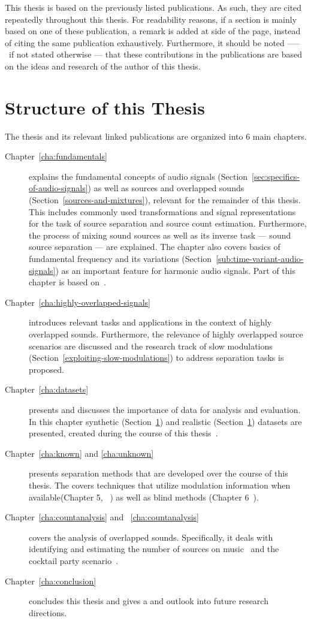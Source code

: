This thesis is based on the previously listed publications. As such, they are cited repeatedly throughout this thesis. For readability reasons, if a section is mainly based on one of these publication, a remark is added at side of the page, instead of citing the same publication exhaustively. Furthermore, it should be noted ––– if not stated otherwise ---  that these contributions in the publications are based on the ideas and research of the author of this thesis.

\section{Structure of this Thesis}

The thesis and its relevant linked publications are organized into 6 main chapters.
\begin{description}
  \item[Chapter~\ref{cha:fundamentals}] explains the fundamental concepts of audio signals (Section~\ref{sec:specifics-of-audio-signals}) as well as sources and overlapped sounds (Section~\ref{sources-and-mixtures}), relevant for the remainder of this thesis.
  This includes commonly used transformations and signal representations for the task of source separation and source count estimation.
  Furthermore, the process of mixing sound sources as well as its inverse task --- sound source separation --- are explained.
  The chapter also covers basics of fundamental frequency and its variations (Section~\ref{sub:time-variant-audio-signals}) as an important feature for harmonic audio signals.
  Part of this chapter is based on~\cite{rafii18}.
  \item[Chapter~\ref{cha:highly-overlapped-signals}] introduces relevant tasks and applications in the context of highly overlapped sounds.
  Furthermore, the relevance of highly overlapped source scenarios are discussed and the research track of slow  modulations (Section~\ref{exploiting-slow-modulations}) to address separation tasks is proposed.
  \item[Chapter~\ref{cha:datasets}] presents and discusses the importance of data for analysis and evaluation.
  In this chapter synthetic (Section~\ref{}) and realistic (Section~\ref{}) datasets are presented, created during the course of this thesis~\cite{oss_wice, oss_unison, oss_libricount, stoeter15acm, liutkus17}.
  \item[Chapter~\ref{cha:known} and \ref{cha:unknown}] presents separation methods that are developed over the course of this thesis.
  The covers techniques that utilize modulation information when available(Chapter 5, ~\cite{stoeter14, stoeter15icassp}) as well as blind methods (Chapter 6~\cite{stoeter16, liutkus17}).
  \item[Chapter~\ref{cha:countanalysis} and ~\ref{cha:countanalysis}] covers the analysis of overlapped sounds. Specifically, it deals with identifying and estimating the number of sources on music~\cite{schoeffler13, stoeter13} and the cocktail party scenario~\cite{stoeter19, stoeter18}.
  \item[Chapter~\ref{cha:conclusion}] concludes this thesis and gives a and outlook into future research directions.
\end{description}
